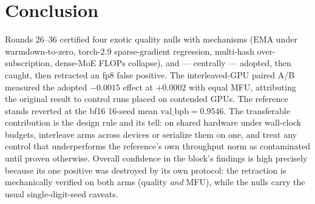 \documentclass{article}
\newcommand{\valbpb}{\mathrm{val\_bpb}}
\begin{document}
\section{Conclusion}
\label{sec:conclusion}

Rounds 26--36 certified four exotic quality nulls with mechanisms (EMA under warmdown-to-zero, torch-2.9 sparse-gradient regression, multi-hash over-subscription, dense-MoE FLOPs collapse), and --- centrally --- adopted, then caught, then retracted an fp8 false positive. The interleaved-GPU paired A/B measured the adopted $-0.0015$ effect at $+0.0002$ with equal MFU, attributing the original result to control runs placed on contended GPUs. The reference stands reverted at the bf16 16-seed mean $\valbpb = 0.9546$. The transferable contribution is the design rule and its tell: on shared hardware under wall-clock budgets, interleave arms across devices or serialize them on one, and treat any control that underperforms the reference's own throughput norm as contaminated until proven otherwise. Overall confidence in the block's findings is high precisely because its one positive was destroyed by its own protocol: the retraction is mechanically verified on both arms (quality \emph{and} MFU), while the nulls carry the usual single-digit-seed caveats.


\end{document}
